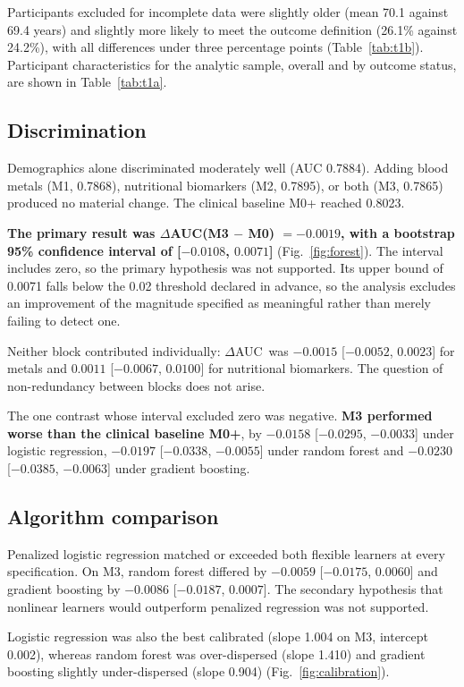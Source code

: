 \documentclass[12pt]{article}
\newcommand{\deltaauc}{$\Delta$AUC}
\begin{document}
Participants excluded for incomplete data were slightly older (mean 70.1 against 69.4 years) and slightly more likely to meet the outcome definition (26.1\% against 24.2\%), with all differences under three percentage points (Table~\ref{tab:t1b}). Participant characteristics for the analytic sample, overall and by outcome status, are shown in Table~\ref{tab:t1a}.

\subsection*{Discrimination}

Demographics alone discriminated moderately well (AUC 0.7884). Adding blood metals (M1, 0.7868), nutritional biomarkers (M2, 0.7895), or both (M3, 0.7865) produced no material change. The clinical baseline M0+ reached 0.8023.

\textbf{The primary result was \deltaauc(M3 $-$ M0) $= -0.0019$, with a bootstrap 95\% confidence interval of [$-0.0108$, $0.0071$]} (Fig.~\ref{fig:forest}). The interval includes zero, so the primary hypothesis was not supported. Its upper bound of 0.0071 falls below the 0.02 threshold declared in advance, so the analysis excludes an improvement of the magnitude specified as meaningful rather than merely failing to detect one.

Neither block contributed individually: \deltaauc\ was $-0.0015$ [$-0.0052$, $0.0023$] for metals and $0.0011$ [$-0.0067$, $0.0100$] for nutritional biomarkers. The question of non-redundancy between blocks does not arise.

The one contrast whose interval excluded zero was negative. \textbf{M3 performed worse than the clinical baseline M0+}, by $-0.0158$ [$-0.0295$, $-0.0033$] under logistic regression, $-0.0197$ [$-0.0338$, $-0.0055$] under random forest and $-0.0230$ [$-0.0385$, $-0.0063$] under gradient boosting.

\subsection*{Algorithm comparison}

Penalized logistic regression matched or exceeded both flexible learners at every specification. On M3, random forest differed by $-0.0059$ [$-0.0175$, $0.0060$] and gradient boosting by $-0.0086$ [$-0.0187$, $0.0007$]. The secondary hypothesis that nonlinear learners would outperform penalized regression was not supported.

Logistic regression was also the best calibrated (slope 1.004 on M3, intercept 0.002), whereas random forest was over-dispersed (slope 1.410) and gradient boosting slightly under-dispersed (slope 0.904) (Fig.~\ref{fig:calibration}).
\end{document}
